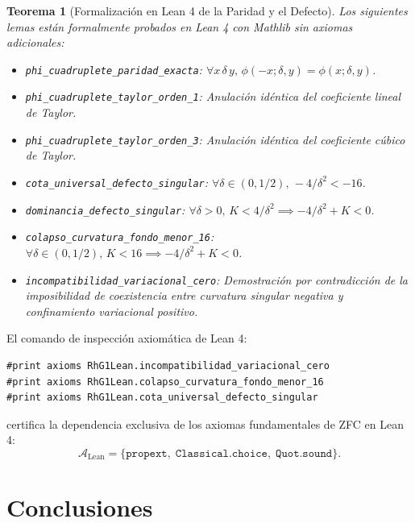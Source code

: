 \documentclass[11pt,a4paper]{article}
\newtheorem{theorem}{Teorema}[section]
\theoremstyle{definition}
\theoremstyle{remark}
\begin{document}
\begin{theorem}[Formalización en Lean 4 de la Paridad y el Defecto]
Los siguientes lemas están formalmente probados en Lean 4 con Mathlib sin axiomas adicionales:
\begin{itemize}
    \item \texttt{phi\_cuadruplete\_paridad\_exacta}: $\forall x \, \delta \, y, \, \phi(-x; \delta, y) = \phi(x; \delta, y)$.
    \item \texttt{phi\_cuadruplete\_taylor\_orden\_1}: Anulación idéntica del coeficiente lineal de Taylor.
    \item \texttt{phi\_cuadruplete\_taylor\_orden\_3}: Anulación idéntica del coeficiente cúbico de Taylor.
    \item \texttt{cota\_universal\_defecto\_singular}: $\forall \delta \in (0, 1/2), \, -4/\delta^2 < -16$.
    \item \texttt{dominancia\_defecto\_singular}: $\forall \delta > 0, \, K < 4/\delta^2 \implies -4/\delta^2 + K < 0$.
    \item \texttt{colapso\_curvatura\_fondo\_menor\_16}: $\forall \delta \in (0, 1/2), \, K < 16 \implies -4/\delta^2 + K < 0$.
    \item \texttt{incompatibilidad\_variacional\_cero}: Demostración por contradicción de la imposibilidad de coexistencia entre curvatura singular negativa y confinamiento variacional positivo.
\end{itemize}
\end{theorem}

El comando de inspección axiomática de Lean 4:
\begin{verbatim}
#print axioms RhG1Lean.incompatibilidad_variacional_cero
#print axioms RhG1Lean.colapso_curvatura_fondo_menor_16
#print axioms RhG1Lean.cota_universal_defecto_singular
\end{verbatim}
certifica la dependencia exclusiva de los axiomas fundamentales de ZFC en Lean 4:
\begin{equation}
\mathcal{A}_{\text{Lean}} = \{\texttt{propext}, \; \texttt{Classical.choice}, \; \texttt{Quot.sound}\}.
\end{equation}

\section{Conclusiones}
\end{document}
